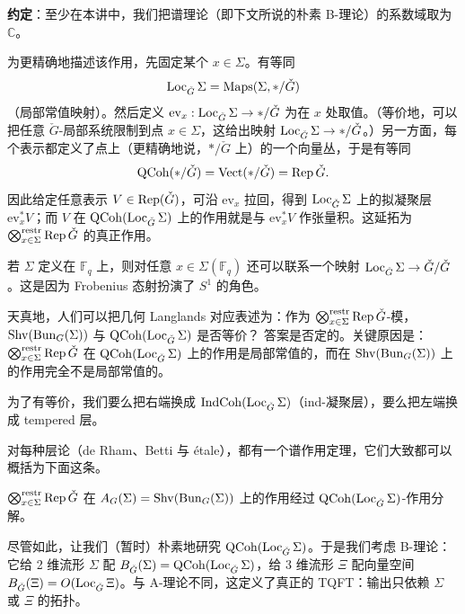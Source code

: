 \textbf{约定}：至少在本讲中，我们把谱理论（即下文所说的朴素 B-理论）的系数域取为 $\mathbb C$。

为更精确地描述该作用，先固定某个 $x\in\Sigma$。有等同
\[
  \operatorname{Loc}_{\check G}\Sigma=\operatorname{Maps}(\Sigma,*/\check G)
\]
（局部常值映射）。然后定义 $\mathrm{ev}_x:\operatorname{Loc}_{\check G}\Sigma\to*/\check G$ 为在 $x$ 处取值。（等价地，可以把任意 $\check G$-局部系统限制到点 $x\in\Sigma$，这给出映射 $\operatorname{Loc}_{\check G}\Sigma\to*/\check G$。）另一方面，每个表示都定义了点上（更精确地说，$*/\check G$ 上）的一个向量丛，于是有等同
\[
  \operatorname{QCoh}(*/\check G)=\operatorname{Vect}(*/\check G)=\operatorname{Rep}\check G.
\]
因此给定任意表示 $V\in\operatorname{Rep}(\check G)$，可沿 $\mathrm{ev}_x$ 拉回，得到 $\operatorname{Loc}_{\check G}\Sigma$ 上的拟凝聚层 $\mathrm{ev}_x^*V$；而 $V$ 在 $\operatorname{QCoh}(\operatorname{Loc}_{\check G}\Sigma)$ 上的作用就是与 $\mathrm{ev}_x^*V$ 作张量积。这延拓为 $\bigotimes\nolimits_{x\in\Sigma}^{\mathrm{restr}}\operatorname{Rep}\check G$ 的真正作用。

\begin{rem}
若 $\Sigma$ 定义在 $\mathbb F_q$ 上，则对任意 $x\in\Sigma(\mathbb F_q)$ 还可以联系一个映射 $\operatorname{Loc}_{\check G}\Sigma\to\check G/\check G$。这是因为 Frobenius 态射扮演了 $S^1$ 的角色。
\end{rem}

天真地，人们可以把几何 Langlands 对应表述为：作为 $\bigotimes\nolimits_{x\in\Sigma}^{\mathrm{restr}}\operatorname{Rep}\check G$-模，$\operatorname{Shv}(\operatorname{Bun}_G(\Sigma))$ 与 $\operatorname{QCoh}(\operatorname{Loc}_{\check G}\Sigma)$ 是否等价？
答案是否定的。关键原因是：$\bigotimes\nolimits_{x\in\Sigma}^{\mathrm{restr}}\operatorname{Rep}\check G$ 在 $\operatorname{QCoh}(\operatorname{Loc}_{\check G}\Sigma)$ 上的作用是局部常值的，而在 $\operatorname{Shv}(\operatorname{Bun}_G(\Sigma))$ 上的作用完全不是局部常值的。

为了有等价，我们要么把右端换成 $\operatorname{IndCoh}(\operatorname{Loc}_{\check G}\Sigma)$（ind-凝聚层），要么把左端换成 tempered 层。

\begin{rem}
对每种层论（de Rham、Betti 与 étale），都有一个谱作用定理，它们大致都可以概括为下面这条。
\end{rem}

\begin{thm}[谱作用]
$\bigotimes\nolimits_{x\in\Sigma}^{\mathrm{restr}}\operatorname{Rep}\check G$ 在 $A_G(\Sigma)=\operatorname{Shv}(\operatorname{Bun}_G(\Sigma))$ 上的作用经过 $\operatorname{QCoh}(\operatorname{Loc}_{\check G}\Sigma)$-作用分解。
\end{thm}

尽管如此，让我们（暂时）朴素地研究 $\operatorname{QCoh}(\operatorname{Loc}_{\check G}\Sigma)$。于是我们考虑 B-理论：它给 2 维流形 $\Sigma$ 配 $B_{\check G}(\Sigma)=\operatorname{QCoh}(\operatorname{Loc}_{\check G}\Sigma)$，给 3 维流形 $\Xi$ 配向量空间 $B_{\check G}(\Xi)=O(\operatorname{Loc}_{\check G}\Xi)$。与 A-理论不同，这定义了真正的 TQFT：输出只依赖 $\Sigma$ 或 $\Xi$ 的拓扑。

